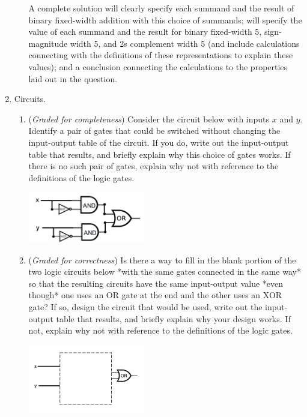 \documentclass[12pt, oneside]{article}
\newcommand{\gradeCorrect}{({\it Graded for correctness}) }
\newcommand{\gradeComplete}{({\it Graded for completeness}) }
\begin{document}
\begin{enumerate}[labelindent=0pt, leftmargin=0pt]
\begin{enumerate}
            A complete solution will clearly specify each summand and the result of binary fixed-width addition 
            with this choice of summands; will specify  the value of each summand and the result for 
            binary fixed-width 5, 
            sign-magnitude width 5, and 2s complement width 5 (and include calculations connecting with the 
            definitions of these representations to explain these values); and a conclusion connecting
            the calculations to the properties laid out in the question.
        \end{enumerate}    
        \item Circuits. 
        \begin{enumerate}
            \item\gradeComplete Consider the circuit below with inputs $x$ and $y$. 
            Identify a pair of gates that could 
            be switched without changing the input-output table of the circuit.
            If you do, write 
            out the input-output table that results, and briefly explain why 
            this choice of gates works. If there is no such pair of gates, 
            explain why not with reference to the definitions
            of the logic gates.            
        \begin{center}
            \includegraphics[width=2in]{../../files/circuits-hw3.png}
        \end{center}

        \item\gradeCorrect  Is there a way to fill in the blank portion of 
        the two logic circuits below *with the same gates connected in the same way*
        so that the resulting circuits have the same 
        input-output value *even though* one uses an OR gate at the end and the other 
        uses an XOR gate? If so, design the circuit that would be used, write 
        out the input-output table that results, and briefly explain why your 
        design works. If not, explain why not with reference to the definitions
        of the logic gates.
        \begin{multicols}{2}
            \begin{center}
                \includegraphics[width=2in]{../../files/circuit-blank-or-hw3.png}
            \end{center}
     

\end{multicols}
\end{enumerate}
\end{enumerate}
\end{document}
